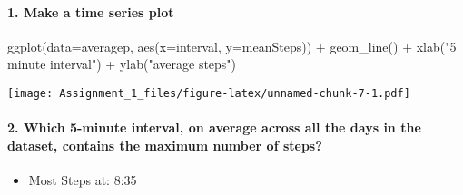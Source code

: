 \documentclass[
]{article}
\newenvironment{Shaded}{\begin{snugshade}}{\end{snugshade}}
\newcommand{\AttributeTok}[1]{\textcolor[rgb]{0.77,0.63,0.00}{#1}}
\newcommand{\FunctionTok}[1]{\textcolor[rgb]{0.00,0.00,0.00}{#1}}
\newcommand{\NormalTok}[1]{#1}
\newcommand{\OtherTok}[1]{\textcolor[rgb]{0.56,0.35,0.01}{#1}}
\newcommand{\SpecialCharTok}[1]{\textcolor[rgb]{0.00,0.00,0.00}{#1}}
\newcommand{\StringTok}[1]{\textcolor[rgb]{0.31,0.60,0.02}{#1}}
\providecommand{\tightlist}{%
  \setlength{\itemsep}{0pt}\setlength{\parskip}{0pt}}
\begin{document}
\hypertarget{make-a-time-series-plot}{%
\paragraph{1. Make a time series plot}\label{make-a-time-series-plot}}

\begin{Shaded}
\begin{Highlighting}[]
\FunctionTok{ggplot}\NormalTok{(}\AttributeTok{data=}\NormalTok{averagep, }\FunctionTok{aes}\NormalTok{(}\AttributeTok{x=}\NormalTok{interval, }\AttributeTok{y=}\NormalTok{meanSteps)) }\SpecialCharTok{+}
    \FunctionTok{geom\_line}\NormalTok{() }\SpecialCharTok{+}
    \FunctionTok{xlab}\NormalTok{(}\StringTok{"5 minute interval"}\NormalTok{) }\SpecialCharTok{+}
    \FunctionTok{ylab}\NormalTok{(}\StringTok{"average steps"}\NormalTok{) }
\end{Highlighting}
\end{Shaded}

\texttt{[image: Assignment\_1\_files/figure-latex/unnamed-chunk-7-1.pdf]}

\hypertarget{which-5-minute-interval-on-average-across-all-the-days-in-the-dataset-contains-the-maximum-number-of-steps}{%
\paragraph{2. Which 5-minute interval, on average across all the days in
the dataset, contains the maximum number of
steps?}\label{which-5-minute-interval-on-average-across-all-the-days-in-the-dataset-contains-the-maximum-number-of-steps}}

\begin{Shaded}
\end{Shaded}

\begin{itemize}
\tightlist
\item
  Most Steps at: 8:35
\end{itemize}
\end{document}
